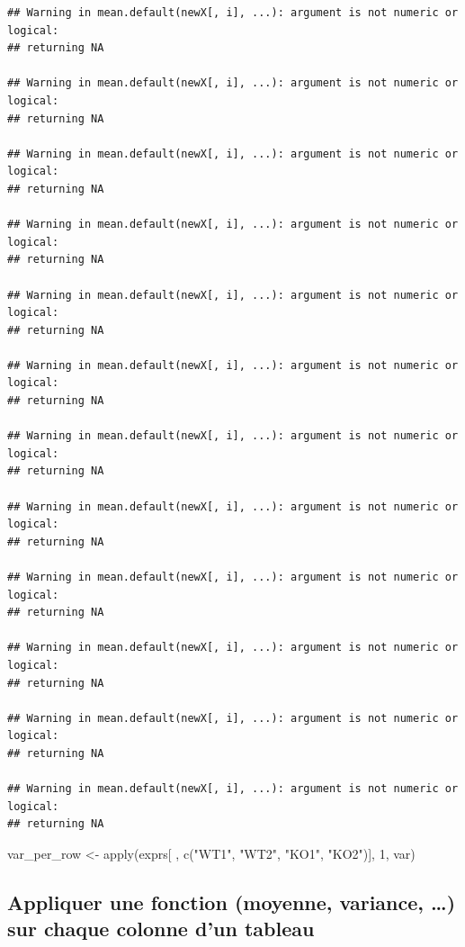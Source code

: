 \documentclass[
]{book}
\newenvironment{Shaded}{\begin{snugshade}}{\end{snugshade}}
\newcommand{\DecValTok}[1]{\textcolor[rgb]{0.00,0.00,0.81}{#1}}
\newcommand{\FunctionTok}[1]{\textcolor[rgb]{0.00,0.00,0.00}{#1}}
\newcommand{\NormalTok}[1]{#1}
\newcommand{\OtherTok}[1]{\textcolor[rgb]{0.56,0.35,0.01}{#1}}
\newcommand{\StringTok}[1]{\textcolor[rgb]{0.31,0.60,0.02}{#1}}
\begin{document}
\begin{verbatim}
## Warning in mean.default(newX[, i], ...): argument is not numeric or logical:
## returning NA

## Warning in mean.default(newX[, i], ...): argument is not numeric or logical:
## returning NA

## Warning in mean.default(newX[, i], ...): argument is not numeric or logical:
## returning NA

## Warning in mean.default(newX[, i], ...): argument is not numeric or logical:
## returning NA

## Warning in mean.default(newX[, i], ...): argument is not numeric or logical:
## returning NA

## Warning in mean.default(newX[, i], ...): argument is not numeric or logical:
## returning NA

## Warning in mean.default(newX[, i], ...): argument is not numeric or logical:
## returning NA

## Warning in mean.default(newX[, i], ...): argument is not numeric or logical:
## returning NA

## Warning in mean.default(newX[, i], ...): argument is not numeric or logical:
## returning NA

## Warning in mean.default(newX[, i], ...): argument is not numeric or logical:
## returning NA

## Warning in mean.default(newX[, i], ...): argument is not numeric or logical:
## returning NA

## Warning in mean.default(newX[, i], ...): argument is not numeric or logical:
## returning NA
\end{verbatim}

\begin{Shaded}
\begin{Highlighting}[]
\NormalTok{var\_per\_row }\OtherTok{\textless{}{-}} \FunctionTok{apply}\NormalTok{(exprs[ , }\FunctionTok{c}\NormalTok{(}\StringTok{"WT1"}\NormalTok{, }\StringTok{"WT2"}\NormalTok{, }\StringTok{"KO1"}\NormalTok{, }\StringTok{"KO2"}\NormalTok{)], }\DecValTok{1}\NormalTok{, var)}
\end{Highlighting}
\end{Shaded}

\hypertarget{appliquer-une-fonction-moyenne-variance-sur-chaque-colonne-dun-tableau}{%
\subsection{Appliquer une fonction (moyenne, variance, \ldots) sur chaque colonne d'un tableau}\label{appliquer-une-fonction-moyenne-variance-sur-chaque-colonne-dun-tableau}}
\end{document}
